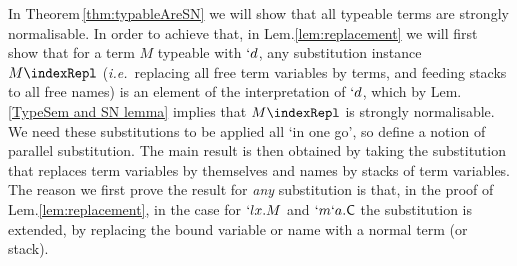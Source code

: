 \documentclass{lmcs}
\def\ie{\emph{i.e.}}
\begin{document}
In Theorem\,\ref{thm:typableAreSN} we will show that all typeable terms are strongly normalisable.
In order to achieve that, in Lem.\skp\ref{lem:replacement} we will first show that for a term $M$ typeable with $`d$, any substitution instance $M \indexRepl $ (\ie~replacing all free term variables by terms, and feeding stacks to all free names) is an element of the interpretation of $`d$, which by Lem.\skp\ref{TypeSem and SN lemma} implies that $M \indexRepl $ is strongly normalisable.
We need these substitutions to be applied all `in one go', so define a notion of parallel substitution.
The main result is then obtained by taking the substitution that replaces term variables by themselves and names by stacks of term variables.
The reason we first prove the result for \emph{any} substitution is that, in the proof of Lem.\skp\ref{lem:replacement}, in the case for $`lx.M$ and $`m`a.\textrm{\sf C}$ the substitution is extended, by replacing the bound variable or name with a normal term (or stack).
\end{document}
